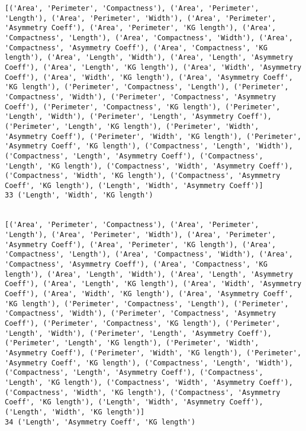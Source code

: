 \documentclass[11pt]{article}
\begin{document}
\begin{Verbatim}[commandchars=\\\{\}]
[('Area', 'Perimeter', 'Compactness'), ('Area', 'Perimeter', 'Length'), ('Area', 'Perimeter', 'Width'), ('Area', 'Perimeter', 'Asymmetry Coeff'), ('Area', 'Perimeter', 'KG length'), ('Area', 'Compactness', 'Length'), ('Area', 'Compactness', 'Width'), ('Area', 'Compactness', 'Asymmetry Coeff'), ('Area', 'Compactness', 'KG length'), ('Area', 'Length', 'Width'), ('Area', 'Length', 'Asymmetry Coeff'), ('Area', 'Length', 'KG length'), ('Area', 'Width', 'Asymmetry Coeff'), ('Area', 'Width', 'KG length'), ('Area', 'Asymmetry Coeff', 'KG length'), ('Perimeter', 'Compactness', 'Length'), ('Perimeter', 'Compactness', 'Width'), ('Perimeter', 'Compactness', 'Asymmetry Coeff'), ('Perimeter', 'Compactness', 'KG length'), ('Perimeter', 'Length', 'Width'), ('Perimeter', 'Length', 'Asymmetry Coeff'), ('Perimeter', 'Length', 'KG length'), ('Perimeter', 'Width', 'Asymmetry Coeff'), ('Perimeter', 'Width', 'KG length'), ('Perimeter', 'Asymmetry Coeff', 'KG length'), ('Compactness', 'Length', 'Width'), ('Compactness', 'Length', 'Asymmetry Coeff'), ('Compactness', 'Length', 'KG length'), ('Compactness', 'Width', 'Asymmetry Coeff'), ('Compactness', 'Width', 'KG length'), ('Compactness', 'Asymmetry Coeff', 'KG length'), ('Length', 'Width', 'Asymmetry Coeff')]
33 ('Length', 'Width', 'KG length')


[('Area', 'Perimeter', 'Compactness'), ('Area', 'Perimeter', 'Length'), ('Area', 'Perimeter', 'Width'), ('Area', 'Perimeter', 'Asymmetry Coeff'), ('Area', 'Perimeter', 'KG length'), ('Area', 'Compactness', 'Length'), ('Area', 'Compactness', 'Width'), ('Area', 'Compactness', 'Asymmetry Coeff'), ('Area', 'Compactness', 'KG length'), ('Area', 'Length', 'Width'), ('Area', 'Length', 'Asymmetry Coeff'), ('Area', 'Length', 'KG length'), ('Area', 'Width', 'Asymmetry Coeff'), ('Area', 'Width', 'KG length'), ('Area', 'Asymmetry Coeff', 'KG length'), ('Perimeter', 'Compactness', 'Length'), ('Perimeter', 'Compactness', 'Width'), ('Perimeter', 'Compactness', 'Asymmetry Coeff'), ('Perimeter', 'Compactness', 'KG length'), ('Perimeter', 'Length', 'Width'), ('Perimeter', 'Length', 'Asymmetry Coeff'), ('Perimeter', 'Length', 'KG length'), ('Perimeter', 'Width', 'Asymmetry Coeff'), ('Perimeter', 'Width', 'KG length'), ('Perimeter', 'Asymmetry Coeff', 'KG length'), ('Compactness', 'Length', 'Width'), ('Compactness', 'Length', 'Asymmetry Coeff'), ('Compactness', 'Length', 'KG length'), ('Compactness', 'Width', 'Asymmetry Coeff'), ('Compactness', 'Width', 'KG length'), ('Compactness', 'Asymmetry Coeff', 'KG length'), ('Length', 'Width', 'Asymmetry Coeff'), ('Length', 'Width', 'KG length')]
34 ('Length', 'Asymmetry Coeff', 'KG length')



\end{Verbatim}
\end{document}
